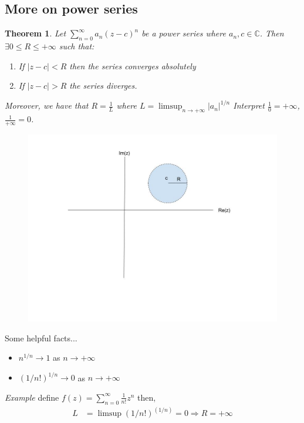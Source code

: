 \documentclass[a4paper, 11pt]{article}
\newtheorem*{theorem}{Theorem}
\begin{document}
\subsection*{More on power series} 
	\begin{theorem}
		Let $\sum\limits_{n=0}^\infty a_n(z-c)^n$ be a power series where $a_n,c\in\mathbb{C}$. Then $\exists 0\leq R\leq +\infty$ such that:
			\begin{enumerate}[label=\alph*]
				\item If $|z-c|<R$ then the series converges absolutely 
				\item If $|z-c|>R$ the series diverges. 
			\end{enumerate} 
		
		
		
		Moreover, we have that $R=\frac{1}{L}$ where $L=\limsup_{n\rightarrow+\infty} |a_n|^{1/n}$ Interpret $\frac{1}{0} = +\infty$, $\frac{1}{+\infty} = 0$. 
	\end{theorem}	\pagebreak
	
	\begin{figure}[!hbt]
		\centering
		\includegraphics[width=0.75\columnwidth]{radiusConvergence}
	\end{figure}
	
	\noindent Some helpful facts... 
		\begin{itemize}
			\item $n^{1/n}\rightarrow 1$ as $n\rightarrow +\infty$
			\item $(1/n!)^{1/n}\rightarrow 0$ as $n\rightarrow +\infty$ 
		\end{itemize}
	
	
	\noindent\textit{Example} define $f(z) = \sum_{n=0}^{\infty}\frac{1}{n!}z^n$ then,\\ 
		\begin{align*}
			L &= \limsup (1/n!)^(1/n) = 0 \Rightarrow R = +\infty
		\end{align*}
	
\end{document}
